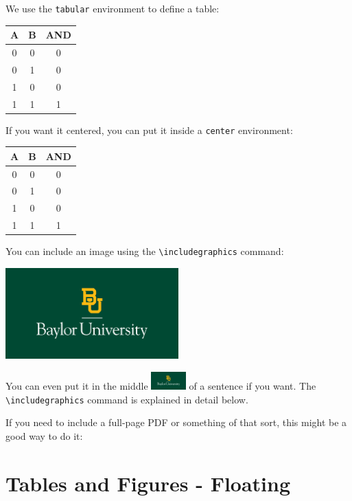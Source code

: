 \documentclass[11pt]{article}
\begin{document}
We use the \texttt{tabular} environment to define a table:

\begin{tabular}{cc|c}
	\toprule
	A & B & AND \\
	\midrule
	0 & 0 & 0 \\
	0 & 1 & 0 \\
	1 & 0 & 0 \\
	1 & 1 & 1 \\
	\bottomrule
\end{tabular} 

If you want it centered, you can put it inside a \texttt{center} environment:

\begin{center}
	\begin{tabular}{cc|c}
		\toprule
		A & B & AND \\
		\midrule
		0 & 0 & 0 \\
		0 & 1 & 0 \\
		1 & 0 & 0 \\
		1 & 1 & 1 \\
		\bottomrule
	\end{tabular} 
\end{center}

You can include an image using the \verb|\includegraphics| command:

\begin{center}
	\includegraphics[width=0.5\textwidth]{BUlogo}
\end{center}

You can even put it in the middle \includegraphics[width=0.1\textwidth]{BUlogo}
of a sentence if you want. The \verb|\includegraphics| command is explained in detail below.

If you need to include a full-page PDF or something of that sort, this might be a good way to do it:



\section*{Tables and Figures - Floating}
\end{document}
